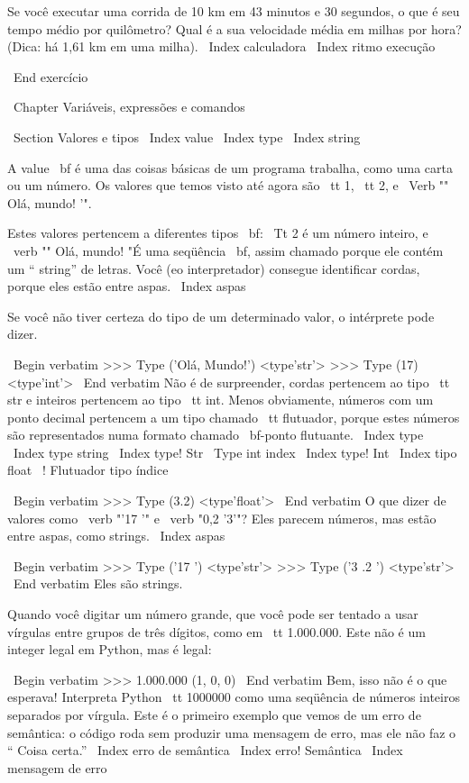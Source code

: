 \documentclass[10pt]{book}
\begin{document}
{Se você executar uma corrida de 10 km em 43 minutos e 30 segundos, o que é seu
tempo médio por quilômetro? Qual é a sua velocidade média em milhas por hora?
(Dica: há 1,61 km em uma milha).
\ Index {calculadora}
\ Index {ritmo execução}

\ End {} exercício




\ Chapter {Variáveis, expressões e comandos}

\ Section {Valores e tipos}
\ Index {value}
\ Index {type}
\ Index {string}

A {value \ bf} é uma das coisas básicas de um programa trabalha,
como uma carta ou um
número. Os valores que temos visto até agora
são {\ tt 1}, {\ tt 2}, e
\ Verb "" Olá, mundo! '".

Estes valores pertencem a diferentes tipos {\ bf}:
{\ Tt 2} é um número inteiro, e \ verb "" Olá, mundo! "É uma seqüência {\ bf},
assim chamado porque ele contém um `` string'' de letras.
Você (eo interpretador) consegue identificar
cordas, porque eles estão entre aspas.
\ Index {aspas}

Se você não tiver certeza do tipo de um determinado valor, o intérprete pode dizer.

\ Begin {verbatim}
>>> Type ('Olá, Mundo!')
<type'str'>
>>> Type (17)
<type'int'>
\ End {verbatim}
%
Não é de surpreender, cordas pertencem ao tipo {\ tt str} e
inteiros pertencem ao tipo {\ tt int}. Menos obviamente, números
com um ponto decimal pertencem a um tipo chamado {\ tt flutuador},
porque estes números são representados numa
formato chamado {\ bf-ponto flutuante}.
\ Index {type}
\ Index {type string}
\ Index {type! Str}
\ {Type} int index
\ Index {type! Int}
\ Index {tipo float}
\ {!} Flutuador tipo índice

\ Begin {verbatim}
>>> Type (3.2)
<type'float'>
\ End {verbatim}
%
O que dizer de valores como \ verb "'17 '" e \ verb "0,2 '3'"?
Eles parecem números, mas estão entre aspas, como
strings.
\ Index {aspas}

\ Begin {verbatim}
>>> Type ('17 ')
<type'str'>
>>> Type ('3 .2 ')
<type'str'>
\ End {verbatim}
%
Eles são strings.

Quando você digitar um número grande, que você pode ser tentado a usar vírgulas
entre grupos de três dígitos, como em {\ tt 1.000.000}. Este não é um
integer legal em Python, mas é legal:

\ Begin {verbatim}
>>> 1.000.000
(1, 0, 0)
\ End {verbatim}
%
Bem, isso não é o que esperava! Interpreta Python {\ tt
  1000000} como uma seqüência de números inteiros separados por vírgula.
Este é o primeiro exemplo que vemos de um erro de semântica: o código
roda sem produzir uma mensagem de erro, mas ele não faz o
`` Coisa certa.''
\ Index {erro de semântica}
\ Index {erro! Semântica}
\ Index {mensagem de erro}



}
\end{document}
